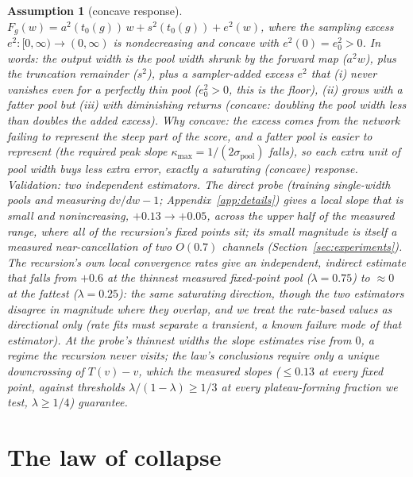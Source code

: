 \documentclass[11pt]{article}
\newtheorem{assumption}{Assumption}
\theoremstyle{remark}
\begin{document}
\begin{assumption}[concave response]\label{ass:a2}
$F_g(w)=a^2(t_0(g))\,w+s^2(t_0(g))+e^2(w)$, where the sampling excess
$e^2:[0,\infty)\to(0,\infty)$ is nondecreasing and concave with $e^2(0)=e_0^2>0$.
\emph{In words:} the output width is the pool width shrunk by the forward map
($a^2w$), plus the truncation remainder ($s^2$), plus a sampler-added excess $e^2$
that (i) never vanishes even for a perfectly thin pool ($e_0^2>0$, this is the floor),
(ii) grows with a fatter pool but (iii) with diminishing returns (concave: doubling the
pool width less than doubles the added excess).
\emph{Why concave:} the excess comes from the network failing to represent the steep part
of the score, and a fatter pool is \emph{easier} to represent (the required peak slope
$\kappa_{\max}=1/(2\sigma_{\text{pool}})$ falls), so each extra unit of pool width buys
less extra error, exactly a saturating (concave) response.
\emph{Validation:} two independent estimators. The direct probe (training
single-width pools and measuring $dv/dw-1$; Appendix~\ref{app:details}) gives a local
slope that is small and nonincreasing, $+0.13\to+0.05$, across the upper half of the
measured range, where all of the recursion's fixed points sit; its small magnitude is
itself a measured near-cancellation of two $O(0.7)$ channels
(Section~\ref{sec:experiments}). The recursion's own local convergence rates give an
independent, indirect estimate that falls from $+0.6$ at the thinnest measured
fixed-point pool ($\lambda=0.75$) to $\approx0$ at the fattest ($\lambda=0.25$): the
same saturating direction, though the two estimators disagree in magnitude where they
overlap, and we treat the rate-based values as directional only (rate fits must
separate a transient, a known failure mode of that estimator). At the probe's thinnest
widths the slope estimates rise from $0$, a regime the recursion never visits; the
law's conclusions require only a unique downcrossing of $T(v)-v$, which the measured
slopes ($\le0.13$ at every fixed point, against thresholds
$\lambda/(1-\lambda)\ge1/3$ at every plateau-forming fraction we test, $\lambda\ge1/4$)
guarantee.
\end{assumption}

\section{The law of collapse}\label{sec:law}
\end{document}
